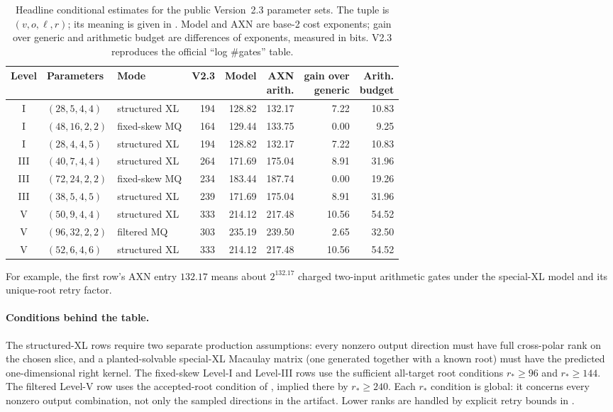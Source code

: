 \documentclass[11pt]{article}
\begin{document}
\begin{table}[H]
\centering
\caption{Headline conditional estimates for the public Version~2.3 parameter
sets.  The tuple is $(v,o,\ell,r)$; its meaning is given in
.  Model and AXN are base-2 cost exponents; gain over generic
and arithmetic budget are differences of exponents, measured in bits.  V2.3
reproduces the official ``log \#gates'' table.}
\label{tab:main}
\footnotesize
\setlength{\tabcolsep}{2.3pt}
\renewcommand{\arraystretch}{1.08}
\begin{tabular}{@{}c l l r r r r r@{}}
\toprule
Level & Parameters & Mode & V2.3 & Model & \shortstack{AXN\\arith.} &
\shortstack{gain over\\generic} & \shortstack{Arith.\\budget}\\
\midrule
I   & $(28,5,4,4)$  & structured XL & 194 & 128.82 & 132.17 &  7.22 & 10.83\\
I   & $(48,16,2,2)$ & fixed-skew MQ & 164 & 129.44 & 133.75 &  0.00 &  9.25\\
I   & $(28,4,4,5)$  & structured XL & 194 & 128.82 & 132.17 &  7.22 & 10.83\\
\midrule
III & $(40,7,4,4)$  & structured XL & 264 & 171.69 & 175.04 &  8.91 & 31.96\\
III & $(72,24,2,2)$ & fixed-skew MQ & 234 & 183.44 & 187.74 &  0.00 & 19.26\\
III & $(38,5,4,5)$  & structured XL & 239 & 171.69 & 175.04 &  8.91 & 31.96\\
\midrule
V   & $(50,9,4,4)$  & structured XL & 333 & 214.12 & 217.48 & 10.56 & 54.52\\
V   & $(96,32,2,2)$ & filtered MQ   & 303 & 235.19 & 239.50 &  2.65 & 32.50\\
V   & $(52,6,4,6)$  & structured XL & 333 & 214.12 & 217.48 & 10.56 & 54.52\\
\bottomrule
\end{tabular}
\end{table}

For example, the first row's AXN entry $132.17$ means about $2^{132.17}$
charged two-input arithmetic gates under the special-XL model and its
unique-root retry factor.

\paragraph{Conditions behind the table.}
The structured-XL rows require two separate production assumptions: every
nonzero output direction must have full cross-polar rank on the chosen slice,
and a planted-solvable special-XL Macaulay matrix (one generated together
with a known root) must have the predicted one-dimensional right kernel.  The fixed-skew Level-I and Level-III rows use
the sufficient all-target root conditions $r_*\ge96$ and $r_*\ge144$.  The
filtered Level-V row uses the accepted-root condition of
, implied there by $r_*\ge240$.  Each $r_*$ condition
is global: it concerns every nonzero output combination, not only the sampled
directions in the artifact.  Lower ranks are handled by explicit retry bounds
in .
\end{document}
